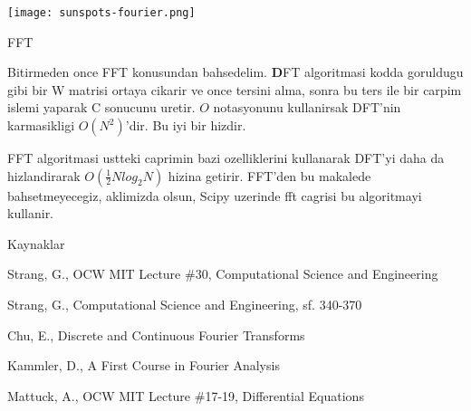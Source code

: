 \documentclass[12pt,fleqn]{article}\usepackage{../common}
\begin{document}
\texttt{[image: sunspots-fourier.png]}

FFT

Bitirmeden once FFT konusundan bahsedelim. \textbf{D}FT algoritmasi kodda
goruldugu gibi bir W matrisi ortaya cikarir ve once tersini alma, sonra bu ters
ile bir carpim islemi yaparak C sonucunu uretir. $O$ notasyonunu kullanirsak
DFT'nin karmasikligi $O(N^2)$'dir. Bu iyi bir hizdir. 

FFT algoritmasi ustteki caprimin bazi ozelliklerini kullanarak DFT'yi daha da
hizlandirarak $O(\frac{1}{2}Nlog_2N)$ hizina getirir. FFT'den bu makalede
bahsetmeyecegiz, aklimizda olsun, Scipy uzerinde fft cagrisi bu algoritmayi
kullanir.

Kaynaklar

Strang, G., OCW MIT Lecture \#30, Computational Science and Engineering

Strang, G., Computational Science and Engineering, sf. 340-370

Chu, E., Discrete and Continuous Fourier Transforms

Kammler, D., A First Course in Fourier Analysis

Mattuck, A., OCW MIT Lecture \#17-19, Differential Equations
\end{document}

